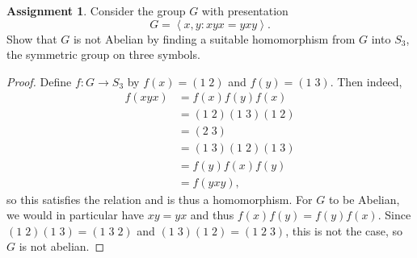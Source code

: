 \documentclass[12pt]{article}
\theoremstyle{definition}
\newtheorem{ex}{Assignment}
\begin{document}
\begin{ex}
	Consider the group $G$ with presentation \begin{equation*}
		G = \left\langle x, y : xyx = yxy \right\rangle.
	\end{equation*}
	Show that $G$ is not Abelian by finding a suitable homomorphism from $G$ into $S_3$, the symmetric group on three symbols.
\end{ex}
\begin{proof}
	Define $f : G \to S_3$ by $f(x) = (1\;2)$ and $f(y) = (1\;3)$.
	Then indeed, \begin{align*}
		f(xyx) & = f(x)f(y)f(x)       \\
		       & = (1\;2)(1\;3)(1\;2) \\
		       & = (2\;3)             \\
		       & = (1\;3)(1\;2)(1\;3) \\
		       & = f(y)f(x)f(y)       \\
		       & = f(yxy),
	\end{align*}
	so this satisfies the relation and is thus a homomorphism.
	For $G$ to be Abelian, we would in particular have $xy = yx$ and thus $f(x)f(y) = f(y)f(x)$.
	Since $(1\;2)(1\;3) = (1\;3\;2)$ and $(1\;3)(1\;2) = (1\;2\;3)$, this is not the case, so $G$ is not abelian.
\end{proof}
\end{document}
